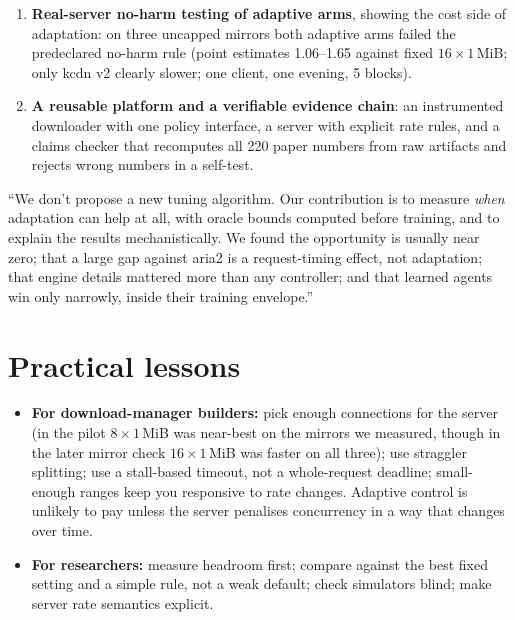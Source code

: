 \begin{enumerate}
\item \textbf{Real-server no-harm testing of adaptive arms}, showing the cost side of adaptation: on three uncapped mirrors both adaptive arms failed the predeclared no-harm rule (point estimates 1.06--1.65 against fixed $16\times1$\,MiB; only kcdn v2 clearly slower; one client, one evening, 5 blocks).
\item \textbf{A reusable platform and a verifiable evidence chain}: an instrumented downloader with one policy interface, a server with explicit rate rules, and a claims checker that recomputes all 220 paper numbers from raw artifacts and rejects wrong numbers in a self-test.
\end{enumerate}

\begin{vivatip}
``We don't propose a new tuning algorithm. Our contribution is to measure \emph{when} adaptation can help at all, with oracle bounds computed before training, and to explain the results mechanistically. We found the opportunity is usually near zero; that a large gap against aria2 is a request-timing effect, not adaptation; that engine details mattered more than any controller; and that learned agents win only narrowly, inside their training envelope.''
\end{vivatip}

\section{Practical lessons}
\begin{itemize}
\item \textbf{For download-manager builders:} pick enough connections for the server (in the pilot $8\times1$\,MiB was near-best on the mirrors we measured, though in the later mirror check $16\times1$\,MiB was faster on all three); use straggler splitting; use a stall-based timeout, not a whole-request deadline; small-enough ranges keep you responsive to rate changes. Adaptive control is unlikely to pay unless the server penalises concurrency in a way that changes over time.
\item \textbf{For researchers:} measure headroom first; compare against the best fixed setting and a simple rule, not a weak default; check simulators blind; make server rate semantics explicit.
\end{itemize}

